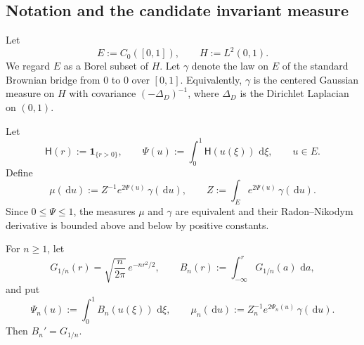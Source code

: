 \documentclass[12pt]{article}
\numberwithin{equation}{section}
\newcommand{\dd}{\,\mathrm d}
\newcommand{\1}{\mathbf 1}
\begin{document}

\date{}

\begin{abstract}
We prove that the Markov semigroup associated with the Dirichlet stochastic heat
equation with drift $\delta_0(u)$ has at most one invariant probability measure.
In fact, under the hypotheses stated in the question, the invariant measure is unique
and is the Gibbs perturbation of the Brownian bridge measure
\[
        \mu(\dd u)=Z^{-1}\exp\!\left(2\int_0^1 \1_{\{u(\xi)>0\}}\dd \xi\right)\gamma(\dd u),
\]
where $\gamma$ is the law of the standard Brownian bridge on $[0,1]$.
The proof uses three inputs: the reversible Gibbs structure of smooth approximations,
the absolute-continuity theorem of Bounebache--Zambotti for the associated
Dirichlet-form resolvent, and irreducibility of the weighted Ornstein--Uhlenbeck
Dirichlet form.
\end{abstract}

\subsection{Notation and the candidate invariant measure}

Let
\[
        E:=C_0([0,1]),\qquad H:=L^2(0,1).
\]
We regard $E$ as a Borel subset of $H$. Let $\gamma$ denote the law on $E$ of the
standard Brownian bridge from $0$ to $0$ over $[0,1]$. Equivalently, $\gamma$ is the
centered Gaussian measure on $H$ with covariance $(-\Delta_D)^{-1}$, where
$\Delta_D$ is the Dirichlet Laplacian on $(0,1)$.

Let
\[
        \mathsf H(r):=\1_{\{r>0\}},\qquad
        \Psi(u):=\int_0^1 \mathsf H(u(\xi))\,\dd \xi,\qquad u\in E.
\]
Define
\begin{equation}\label{eq:mu-def}
        \mu(\dd u)
        := Z^{-1}e^{2\Psi(u)}\,\gamma(\dd u),
        \qquad
        Z:=\int_E e^{2\Psi(u)}\,\gamma(\dd u).
\end{equation}
Since $0\leq \Psi\leq 1$, the measures $\mu$ and $\gamma$ are equivalent and their
Radon--Nikodym derivative is bounded above and below by positive constants.

For $n\geq 1$, let
\[
        G_{1/n}(r)=\sqrt{\frac{n}{2\pi}}\,e^{-nr^2/2},\qquad
        B_n(r):=\int_{-\infty}^r G_{1/n}(a)\,\dd a,
\]
and put
\[
        \Psi_n(u):=\int_0^1 B_n(u(\xi))\,\dd \xi,\qquad
        \mu_n(\dd u):=Z_n^{-1}e^{2\Psi_n(u)}\,\gamma(\dd u).
\]
Then $B_n'=G_{1/n}$.
\end{document}
